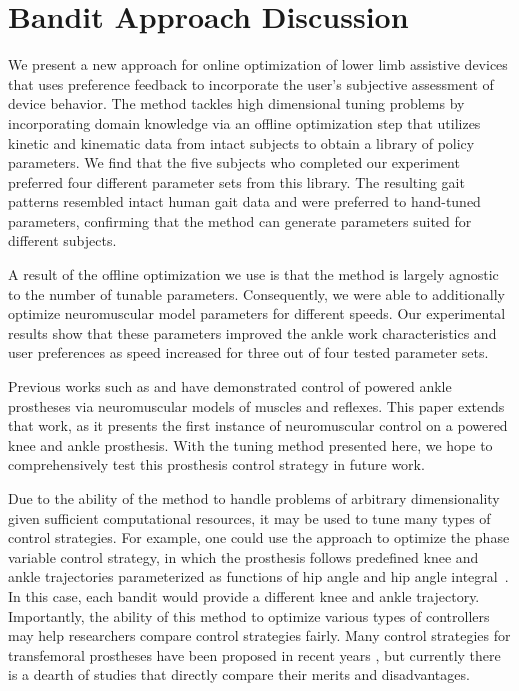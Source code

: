 \section{Bandit Approach Discussion} 

We present a new approach for online optimization of lower limb assistive
devices that uses preference feedback to incorporate the user's subjective
assessment of device behavior. The method tackles high dimensional tuning
problems by incorporating domain knowledge via an offline optimization step that
utilizes kinetic and kinematic data from intact subjects to obtain a library of
policy parameters. We find that the five subjects who completed our experiment
preferred four different parameter sets from this library. The resulting gait
patterns resembled intact human gait data and were preferred to hand-tuned
parameters, confirming that the method can generate parameters suited for
different subjects.

A result of the offline optimization we use is that the method is largely
agnostic to the number of tunable parameters. Consequently, we were able to
additionally optimize neuromuscular model parameters for different speeds.  Our
experimental results show that these parameters improved the ankle work
characteristics and user preferences as speed increased for three out of four
tested parameter sets. 

Previous works such as \citet{eilenberg2010control} and
\citet{markowitz2011speed} have demonstrated control of powered ankle prostheses
via neuromuscular models of muscles and reflexes. This paper extends that work,
as it presents the first instance of neuromuscular control on a powered knee and
ankle prosthesis. With the tuning method presented here, we hope to
comprehensively test this prosthesis control strategy in future work.

Due to the ability of the method to handle problems of arbitrary dimensionality
given sufficient computational resources, it may be used to tune many types of
control strategies. For example, one could use the approach to optimize the
phase variable control strategy, in which the prosthesis follows predefined
knee and ankle trajectories parameterized as functions of hip angle and hip
angle integral~\citep{quintero2016preliminary}. In this case, each bandit would
provide a different knee and ankle trajectory.  Importantly, the ability of this
method to optimize various types of controllers may help researchers compare
control strategies fairly. Many control strategies for transfemoral prostheses
have been proposed in recent years \citep{quintero2016preliminary,
thatte2016toward, lawson2014robotic}, but currently there is a dearth of studies
that directly compare their merits and disadvantages.

